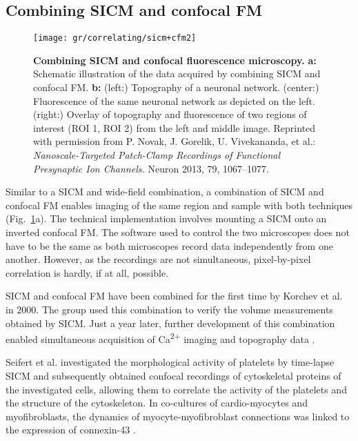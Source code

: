 \subsection{Combining SICM and confocal FM}

\begin{figure}
  \texttt{[image: gr/correlating/sicm+cfm2]}
  \caption{%
    \textbf{Combining SICM and confocal fluorescence microscopy.}
    \textbf{a:} Schematic illustration of the data acquired by combining SICM and confocal FM.
    \textbf{b:} 
    	(left:) Topography of a neuronal network.
    	(center:) Fluorescence of the same neuronal network as depicted on the left.
    	(right:) Overlay of topography and fluorescence of two regions of interest (ROI 1, ROI 2) from
    	the left and middle image.
    Reprinted with permission from P. Novak, J. Gorelik, U. Vivekananda, et
    al.: \emph{Nanoscale-Targeted Patch-Clamp Recordings of Functional
      Presynaptic Ion Channels.} Neuron 2013, 79, 1067--1077.
  }
  \label{fig:sicm+cfm}
\end{figure}

Similar to a SICM and wide-field combination, a combination of SICM and
confocal FM enables imaging of the same region and sample with both techniques
(Fig.~\ref{fig:sicm+cfm}a). The technical implementation involves mounting a
SICM onto an inverted confocal FM. The software used to control the two
microscopes does not have to be the same as both microscopes record data
independently from one another. However, as the recordings are not
simultaneous, pixel-by-pixel correlation is hardly, if at all, possible.

SICM and confocal FM have been combined for the first time by Korchev et al.
\cite{Korchev2000} in 2000. The group used this combination to verify the
volume measurements obtained by SICM. Just a year later, further development
of this combination enabled simultaneous acquisition of Ca\textsuperscript{2+}
imaging and topography data \cite{Shevchuk2001}.

Seifert et al. \cite{Seifert2017} investigated the morphological activity of
platelets by time-lapse SICM and subsequently obtained confocal recordings of
cytoskeletal proteins of the investigated cells, allowing them to correlate
the activity of the platelets and the structure of the cytoskeleton.
In co-cultures of cardio-myocytes and myofibroblasts, the dynamics of
myocyte-myofibroblast connections was linked to the expression of connexin-43
\cite{Schultz2019}.


